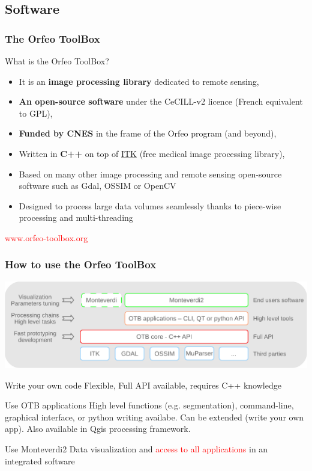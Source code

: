 \documentclass[8pt]{beamer}
\begin{document}
\subsection{Software}
\begin{frame}
\frametitle{The Orfeo ToolBox}
\begin{block}{What is the Orfeo ToolBox?}
\begin{itemize}
\item It is an \textbf{image processing library} dedicated to remote sensing,
\item \textbf{An open-source software} under the CeCILL-v2 licence (French equivalent to GPL),
\item \textbf{Funded by CNES} in the frame of the Orfeo program (and beyond),
\item Written in \textbf{C++} on top of \href{www.itk.org}{ITK} (free medical image processing library),
\item Based on many other image processing and remote sensing open-source software such as Gdal, OSSIM or OpenCV
\item Designed to process large data volumes seamlessly thanks to piece-wise processing and multi-threading
\end{itemize}
\end{block}
\begin{center}
{\huge\textcolor{red}{www.orfeo-toolbox.org}}
\end{center}
\end{frame}


\begin{frame}
\frametitle{How to use the Orfeo ToolBox}
\vspace{-0.5cm}
\begin{center}
\includegraphics[width=\textwidth]{../OTB-General/images/sandwich.pdf}
\end{center}
\vspace{-0.5cm}
\begin{block}{Write your own code}
 Flexible, Full API available, requires C++ knowledge
\end{block}
\begin{block}{Use OTB applications}
  High level functions (e.g. segmentation), command-line, graphical interface, or python writing availabe. Can be extended (write your own app). Also available in Qgis processing framework.
\end{block}
\begin{block}{Use Monteverdi2}
Data visualization and  \textcolor{red}{access to all applications} in an integrated software
\end{block}
\end{frame}
\end{document}
